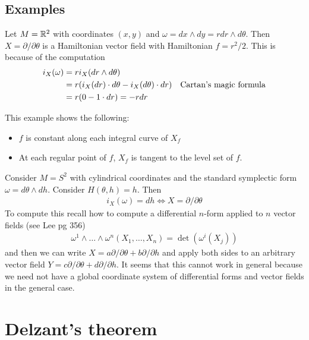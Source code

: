 \documentclass[12pt]{article}
\begin{document}
\subsection{Examples}
\begin{example}
	Let $M = \mathbb{R}^2$ with coordinates $(x,y)$ and $\omega = dx\wedge dy = r dr\wedge d\theta$.
	Then $X = \partial/\partial \theta$ is a Hamiltonian vector field with
	Hamiltonian $f = r^2/2$. This is because of the computation \begin{align*}
		i_X(\omega) & = ri_X(dr\wedge d\theta)                                                         \\
		            & = r(i_X(dr)\cdot d\theta -  i_X(d\theta)\cdot dr) \text{\quad Cartan's magic formula} \\
		            & = r(0 - 1\cdot dr) = -rdr
	\end{align*}
\end{example}

This example shows the following:\begin{itemize}
	\item $f$ is constant along each integral curve of $X_f$
	\item At each regular point of $f$, $X_f$ is tangent to the level set of $f$.
\end{itemize}

\begin{example}
	Consider $M = S^2$ with cylindrical coordinates
	and the standard symplectic form $\omega = d\theta \wedge dh$.
	Consider $H(\theta,h) = h$. Then \begin{align*}
		i_X(\omega) = dh \iff X = \partial/\partial \theta
	\end{align*}
	To compute this recall how to compute a differential $n$-form applied to $n$ vector fields (see Lee pg 356)
	\begin{align*}
		\omega^1\wedge \dots \wedge \omega^n(X_1,\dots,X_n) = \det(\omega^i(X_j))
	\end{align*} and then we can write $X = a\partial/\partial \theta + b\partial/\partial h$ and apply both sides
	to an arbitrary vector field $Y = c\partial/\partial \theta + d\partial/\partial h$. It seems that this cannot work in
	general because we need not have a global coordinate system of differential forms and vector fields in the general case.
\end{example}
\section{Delzant's theorem}
\end{document}
